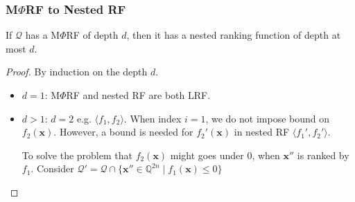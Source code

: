 \documentclass[11pt]{beamer}
\newif\ifcomm\commfalse
\begin{document}
\ifcomm
\begin{frame}\frametitle{M$\Phi$RF to Nested RF}
\begin{theorem}[1]
If $\mathcal{Q}$ has a M$\Phi$RF of depth $d$, then it has a nested ranking function of depth at most $d$.


\end{theorem}


\begin{proof}
By induction on the depth $d$.
\begin{itemize}
\item $d = 1$: M$\Phi$RF and nested RF are both LRF.
\item $d > 1$: $d = 2$ e.g.
$\langle f_1, f_2\rangle$. When index $i = 1$, we do not impose bound on $f_2(\textbf{x})$. However, a bound is needed for $f_2'(\textbf{x})$ in nested RF $\langle f_1', f_2'\rangle$.

To solve the problem that $f_2(\textbf{x})$ might goes under $0$, when $\textbf{x}''$ is ranked by $f_1$. Consider  $\mathcal{Q}' = \mathcal{Q}\cap \{\textbf{x}''\in \mathbb{Q}^{2n}\mid f_1(\textbf{x}) \le 0\}$


\end{itemize}


\end{proof}

\end{frame}
\end{document}
